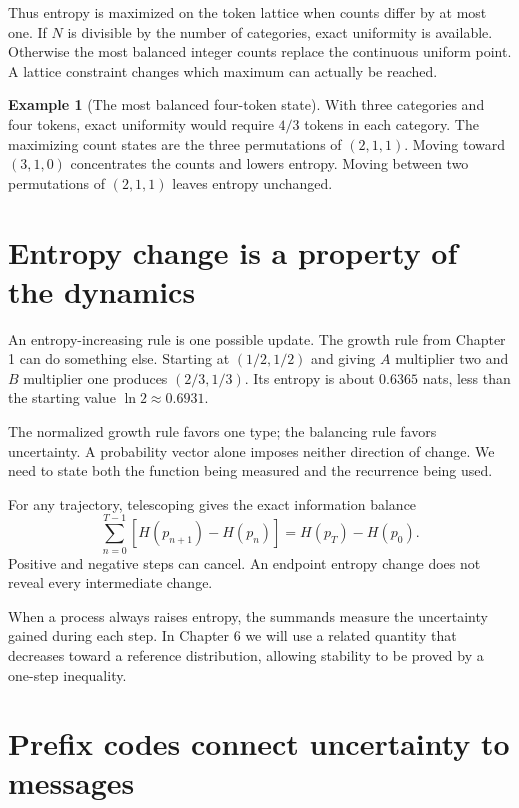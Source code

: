 \documentclass[11pt,oneside,openany]{book}
\theoremstyle{definition}
\newtheorem{example}{Example}[chapter]
\theoremstyle{remark}
\numberwithin{equation}{chapter}
\begin{document}
Thus entropy is maximized on the token lattice when counts differ by at most one. If \(N\) is divisible by the number of categories, exact uniformity is available. Otherwise the most balanced integer counts replace the continuous uniform point. A lattice constraint changes which maximum can actually be reached.

\begin{example}[The most balanced four-token state]

With three categories and four tokens, exact uniformity would require \(4/3\) tokens in each category. The maximizing count states are the three permutations of \((2,1,1)\). Moving toward \((3,1,0)\) concentrates the counts and lowers entropy. Moving between two permutations of \((2,1,1)\) leaves entropy unchanged.

\end{example}

\section{Entropy change is a property of the dynamics}\label{ch05-entropy-change-is-a-property-of-the-dynamics}

An entropy-increasing rule is one possible update. The growth rule from Chapter 1 can do something else. Starting at \((1/2,1/2)\) and giving \(A\) multiplier two and \(B\) multiplier one produces \((2/3,1/3)\). Its entropy is about \(0.6365\) nats, less than the starting value \(\ln2\approx0.6931\).

The normalized growth rule favors one type; the balancing rule favors uncertainty. A probability vector alone imposes neither direction of change. We need to state both the function being measured and the recurrence being used.

For any trajectory, telescoping gives the exact information balance \[\boxed{\sum_{n=0}^{T-1}[H(p_{n+1})-H(p_n)]
=H(p_T)-H(p_0).}\] Positive and negative steps can cancel. An endpoint entropy change does not reveal every intermediate change.

When a process always raises entropy, the summands measure the uncertainty gained during each step. In Chapter 6 we will use a related quantity that decreases toward a reference distribution, allowing stability to be proved by a one-step inequality.

\section{Prefix codes connect uncertainty to messages}\label{ch05-prefix-codes-connect-uncertainty-to-messages}
\end{document}
